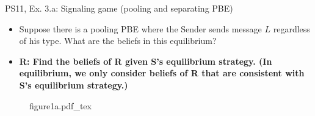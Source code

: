 \begin{frame}{PS11, Ex. 3.a: Signaling game (pooling and separating PBE)}
    \begin{itemize}
      \item[(a)] Suppose there is a pooling PBE where the Sender sends message $L$ regardless of his type. What are the beliefs in this equilibrium?
    \end{itemize} \vspace{-8pt}
    \begin{multicols}{2}
      \begin{itemize}
        \item[SR3:] \textbf{R: Find the beliefs of R given S's equilibrium strategy. (In equilibrium, we only consider beliefs of R that are consistent with S's equilibrium strategy.)}
      \end{itemize}
      \vfill\null\columnbreak
      \begin{figure}[!h]
        \center\def\svgwidth{\columnwidth}
        {figure1a.pdf_tex}
      \end{figure}
      \vfill\null \columnbreak
      \vfill
    \end{multicols}
\end{frame}
